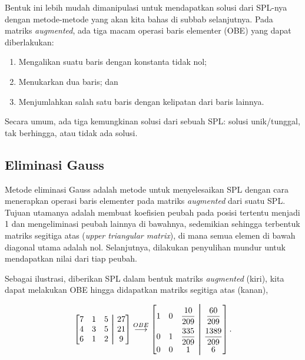 Bentuk ini lebih mudah dimanipulasi untuk mendapatkan solusi dari SPL-nya dengan metode-metode yang akan kita bahas di subbab selanjutnya. Pada matriks \textit{augmented}, ada tiga macam operasi baris elementer (OBE) yang dapat diberlakukan:

\begin{enumerate}
    \item Mengalikan suatu baris dengan konstanta tidak nol;
    \item Menukarkan dua baris; dan
    \item Menjumlahkan salah satu baris dengan kelipatan dari baris lainnya.
\end{enumerate}

Secara umum, ada tiga kemungkinan solusi dari sebuah SPL: solusi unik/tunggal, tak berhingga, atau tidak ada solusi. 

\subsection{Eliminasi Gauss}

Metode eliminasi Gauss adalah metode untuk menyelesaikan SPL dengan cara menerapkan operasi baris elementer pada matriks \textit{augmented} dari suatu SPL. Tujuan utamanya adalah membuat koefisien peubah pada posisi tertentu menjadi 1 dan mengeliminasi peubah lainnya di bawahnya, sedemikian sehingga terbentuk matriks segitiga atas (\textit{upper triangular matrix}), di mana semua elemen di bawah diagonal utama adalah nol. Selanjutnya, dilakukan penyulihan mundur untuk mendapatkan nilai dari tiap peubah. 

Sebagai ilustrasi, diberikan SPL dalam bentuk matriks \textit{augmented} (kiri), kita dapat melakukan OBE hingga didapatkan matriks segitiga atas (kanan),

\[
    \begin{bmatrix}
        7 & 1 & 5 & \aug & 27 \\
        4 & 3 & 5 & \aug & 21 \\
        6 & 1 & 2 & \aug & 9 
    \end{bmatrix}
    \stackrel{OBE}{\longrightarrow}
    \begin{bmatrix}
        1 & 0 & \dfrac{10}{209}  & \text{\huge $\aug$} & \dfrac{60}{209}     \\
        0 & 1 & \dfrac{335}{209} & \text{\huge $\aug$} & \dfrac{1389}{209}   \\
        0 & 0 & 1 & \aug & 6
    \end{bmatrix}.
\]

